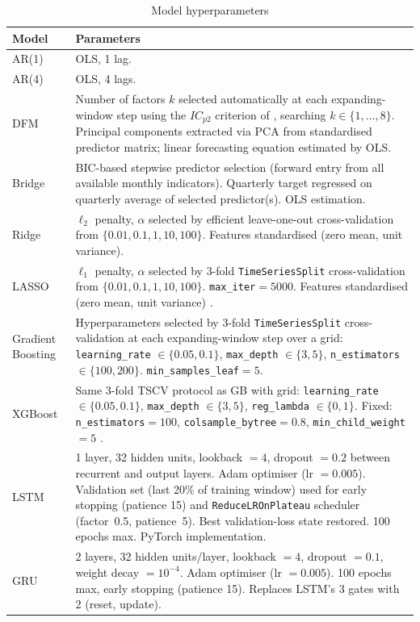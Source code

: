 \begin{table}[htbp]
\centering
\caption{Model hyperparameters}
\label{tab:app_hyperparams}
\small
\begin{tabular}{@{} l p{10cm} @{}}
\toprule
{Model} & {Parameters} \\
\midrule
AR(1) & OLS, 1 lag. \\
\addlinespace
AR(4) & OLS, 4 lags. \\
\addlinespace
DFM & Number of factors $k$ selected automatically at each expanding-window step using the $IC_{p2}$ criterion of \citet{bai2002determining}, searching $k \in \{1,\ldots,8\}$.  Principal components extracted via PCA from standardised predictor matrix; linear forecasting equation estimated by OLS. \\
\addlinespace
Bridge & BIC-based stepwise predictor selection (forward entry from all available monthly indicators).  Quarterly target regressed on quarterly average of selected predictor(s).  OLS estimation. \\
\addlinespace
Ridge & $\ell_2$ penalty, $\alpha$ selected by efficient leave-one-out cross-validation from $\{0.01, 0.1, 1, 10, 100\}$.  Features standardised (zero mean, unit variance). \\
\addlinespace
LASSO & $\ell_1$ penalty, $\alpha$ selected by 3-fold \texttt{TimeSeriesSplit} cross-validation from $\{0.01, 0.1, 1, 10, 100\}$.  \texttt{max\_iter}$= 5000$.  Features standardised (zero mean, unit variance) \citep{tibshirani1996regression}. \\
\addlinespace
Gradient Boosting & Hyperparameters selected by 3-fold \texttt{TimeSeriesSplit} cross-validation at each expanding-window step over a grid: \texttt{learning\_rate} $\in \{0.05, 0.1\}$, \texttt{max\_depth} $\in \{3, 5\}$, \texttt{n\_estimators} $\in \{100, 200\}$.  \texttt{min\_samples\_leaf}$= 5$. \\
\addlinespace
XGBoost & Same 3-fold TSCV protocol as GB with grid: \texttt{learning\_rate} $\in \{0.05, 0.1\}$, \texttt{max\_depth} $\in \{3, 5\}$, \texttt{reg\_lambda} $\in \{0, 1\}$.  Fixed: \texttt{n\_estimators}$= 100$, \texttt{colsample\_bytree}$= 0.8$, \texttt{min\_child\_weight}$= 5$ \citep{chen2016xgboost}. \\
\addlinespace
LSTM & 1 layer, 32 hidden units, lookback $= 4$, dropout $= 0.2$ between recurrent and output layers.  Adam optimiser (lr $= 0.005$).  Validation set (last 20\% of training window) used for early stopping (patience 15) and \texttt{ReduceLROnPlateau} scheduler (factor~0.5, patience~5).  Best validation-loss state restored.  100 epochs max.  PyTorch implementation. \\
\addlinespace
GRU & 2 layers, 32 hidden units/layer, lookback $= 4$, dropout $= 0.1$, weight decay $= 10^{-4}$.  Adam optimiser (lr $= 0.005$).  100 epochs max, early stopping (patience 15).  Replaces LSTM's 3 gates with 2 (reset, update). \\
\bottomrule
\end{tabular}
\end{table}


